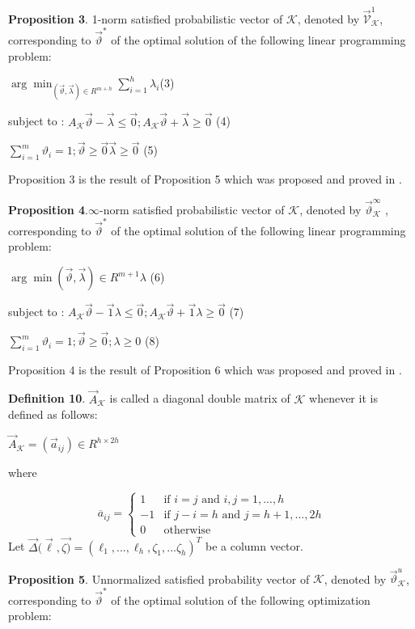 \documentclass[]{iosart2c}
\begin{document}
  \textbf{Proposition 3}. 1-norm satisfied probabilistic vector of $\mathcal{K}$, denoted by $\vec{\mathcal{V}}^1_\mathcal{K}$, corresponding to $\vec{\vartheta}^*$ of the optimal solution of the following linear programming problem:

  $\arg \min _{(\vec{\vartheta},\vec{\lambda}) \in R^{m+h}} \sum^h_{i=1}\lambda_i$(3)

  subject to : $A_\mathcal{K} \vec{\vartheta} - \vec{\lambda} \le \vec{0}; A_\mathcal{K}\vec{\vartheta} + \vec{\lambda}\geq\vec{0}$ (4)

  $\sum^m_{i=1} \vartheta_i = 1; \vec{\vartheta}\geq\vec{0}    \vec{\lambda}\geq \vec{0}$ (5)

  Proposition 3 is the result of Proposition 5 which was proposed and proved in \cite{10}.

  \textbf{Proposition 4}.$\infty$-norm satisfied probabilistic vector of $\mathcal{K}$, denoted by $\vec{\vartheta}^\infty_\mathcal{K}$ , corresponding to $\vec{\vartheta}^*$ of the optimal solution of the following linear programming problem:

  $\arg \min(\vec{\vartheta},\vec{\lambda}) \in R^{m+1}\lambda$ (6)

  subject to : $A_\mathcal{K}\vec{\vartheta} -\vec{1}\lambda \le \vec{0}; A_\mathcal{K}\vec{\vartheta} +\vec{1}\lambda \geq \vec{0}$ (7)

  $\sum^m_{i=1} \vartheta_i = 1; \vec{\vartheta}\geq\vec{0}; \lambda\geq 0$ (8)

  Proposition 4 is the result of Proposition 6 which was proposed and proved in \cite{10}.

  \textbf{Definition 10}. $\vec{A}_\mathcal{K}$ is called a diagonal double matrix of $\mathcal{K}$ whenever it is defined as follows:

  $\vec{A}_\mathcal{K} = (\vec{a}_{ij}) \in R^{h \times 2h}$

  where

  $$\overline{a}_{ij} =
  \begin{cases}
    1        &\text{if $i = j$ and $i, j = 1, ... , h$}\\
    -1    &\text{if $j - i = h$ and $j = h + 1, ... , 2h$}\\
    0        &\text{otherwise}
  \end{cases}
  $$
  Let $\vec{\Delta}(\vec{\ell},\vec{\zeta)} = (\ell_1, ..., \ell_h, \zeta_1, ...\zeta_h)^T$ be a column vector.

  \textbf{Proposition 5}. Unnormalized satisfied probability vector of $\mathcal{K}$, denoted by $\vec{\vartheta}^u_\mathcal{K}$, corresponding to $\vec{\vartheta}^*$ of the optimal solution of the following optimization problem:
\end{document}
